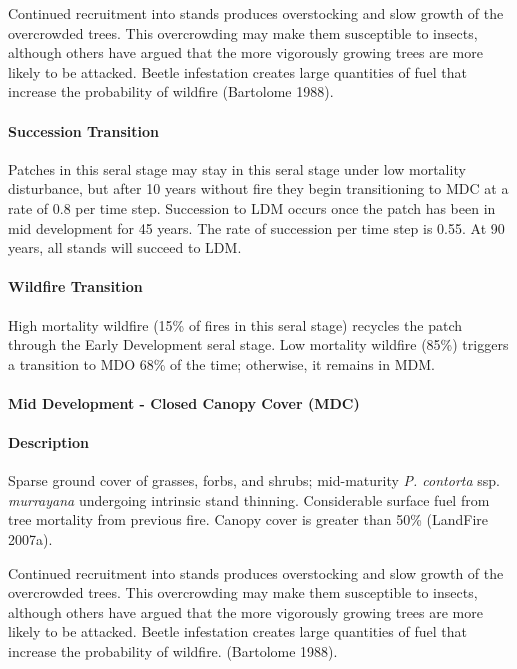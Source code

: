 Continued recruitment into stands produces overstocking and slow growth of the overcrowded trees. This overcrowding may make them susceptible to insects, although others have argued that the more vigorously growing trees are more likely to be attacked. Beetle infestation creates large quantities of fuel that increase the probability of wildfire (Bartolome 1988).


\paragraph{Succession Transition} Patches in this seral stage may stay in this seral stage under low mortality disturbance, but after 10 years without fire they begin transitioning to MDC at a rate of 0.8 per time step. Succession to LDM occurs once the patch has been in mid development for 45 years. The rate of succession per time step is 0.55. At 90 years, all stands will succeed to LDM.

\paragraph{Wildfire Transition} High mortality wildfire (15\% of fires in this seral stage) recycles the patch through the Early Development seral stage. Low mortality wildfire (85\%) triggers a transition to MDO 68\% of the time; otherwise, it remains in MDM.

\noindent\hrulefill

\paragraph{Mid Development - Closed Canopy Cover (MDC)}

\paragraph{Description} Sparse ground cover of grasses, forbs, and shrubs; mid-maturity \emph{P. contorta} ssp. \emph{murrayana} undergoing intrinsic stand thinning. Considerable surface fuel from tree mortality from previous fire. Canopy cover is greater than 50\% (LandFire 2007a).

Continued recruitment into stands produces overstocking and slow growth of the overcrowded trees. This overcrowding may make them susceptible to insects, although others have argued that the more vigorously growing trees are more likely to be attacked. Beetle infestation creates large quantities of fuel that increase the probability of wildfire. (Bartolome 1988).


